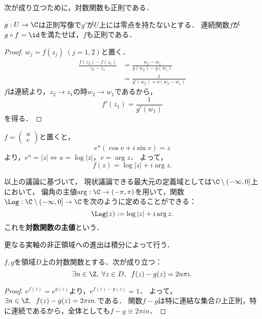 \documentclass[uplatex, dvipdfmx]{jsreport}
\begin{document}
次が成り立つために，対数関数も正則である．

\begin{theorem}[正則性の遺伝]
    $g:U\to\C$は正則写像で$g'$が$U$上には零点を持たないとする．
    連続関数$f$が$g\circ f=\id$を満たせば，$f$も正則である．
\end{theorem}
\begin{proof}
    $w_j=f(z_j)\;(j=1,2)$と置く．
    \begin{align*}
        \frac{f(z_2)-f(z_1)}{z_2-z_1} &= \frac{w_2-w_1}{g(w_2)-g(w_1)}\\
        &= \frac{1}{g'(w_2)+o(w_2-w_1)}
    \end{align*}
    $f$は連続より，$z_2\to z_1$の時$w_2\to w_1$であるから，
    \[ f'(z_1)=\frac{1}{g'(w_1)} \]
    を得る．
\end{proof}

\begin{discussion}[対数関数の形についての必要条件]
    $f=\begin{pmatrix}u\\v\end{pmatrix}$と置くと，
    \[ e^u(\cos v+i\sin v)=z \]
    より，$e^u=|z|\Leftrightarrow u=\log|z|$，$v=\arg z$．
    よって，
    \[ f(z) = \log|z| + i\arg z. \]
\end{discussion}

\begin{definition}
    以上の議論に基づいて，
    現状議論できる最大元の定義域としては$\C\setminus(-\infty,0]$上において，
    偏角の主値$\arg:\C\to(-\pi,\pi)$を用いて，関数$\Log:\C\setminus(-\infty,0]\to\C$を次のように定めることができる：
    \[ \Log(z):=\log|z|+i\arg z. \]
    これを\textbf{対数関数の主値}という．
    
    更なる実軸の非正領域への進出は積分によって行う．
\end{definition}

\begin{theorem}[対数関数は定値関数分の差を除いて一意]\label{thm-period-of-logarithm}
    $f,g$を領域$D$上の対数関数とする．次が成り立つ：
    \[ \exists n\in\Z,\;\forall z\in D,\; \;f(z)-g(z)=2n\pi i. \]
\end{theorem}
\begin{proof}
    $e^{f(z)}=e^{g(z)}$より，$e^{f(z)-g(z)}=1$．
    よって，$\exists n\in\Z,\; \;f(z)-g(z)=2\pi in.$である．
    関数$f-g$は特に連結な集合$D$上正則，特に連続であるから，全体としても$f-g\equiv 2\pi in$．
\end{proof}
\end{document}
